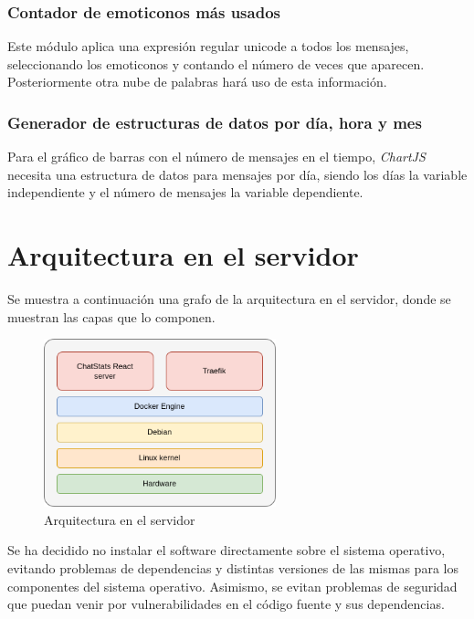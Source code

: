 
\subsubsection{Contador de emoticonos más usados}

Este módulo aplica una expresión regular unicode a todos los mensajes, seleccionando los emoticonos y contando el número de veces que aparecen. Posteriormente otra nube de palabras hará uso de esta información.

\subsubsection{Generador de estructuras de datos por día, hora y mes}

Para el gráfico de barras con el número de mensajes en el tiempo, \textit{ChartJS} necesita una estructura de datos para mensajes por día, siendo los días la variable independiente y el número de mensajes la variable dependiente.


\section{Arquitectura en el servidor}

Se muestra a continuación una grafo de la arquitectura en el servidor, donde se muestran las capas que lo componen.

\begin{figure}[H]
	\centering
	\includegraphics[width=0.6\textwidth]{img/server.png}
	\caption{Arquitectura en el servidor}
	\label{fig:chap4:architecture_server}
\end{figure}

Se ha decidido no instalar el software directamente sobre el sistema operativo, evitando problemas de dependencias y distintas versiones de las mismas para los componentes del sistema operativo. Asimismo, se evitan problemas de seguridad que puedan venir por vulnerabilidades en el código fuente y sus dependencias.

